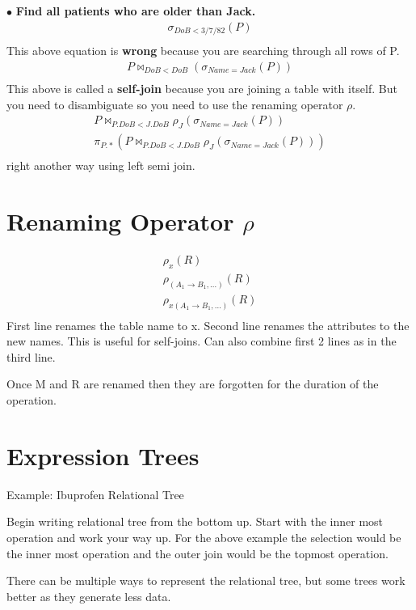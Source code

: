 \documentclass[twoside]{article}
\begin{document}
$\bullet$ \textbf{Find all patients who are older than Jack.}
\begin{gather*}
    \sigma_{DoB < 3/7/82}(P) \\
\end{gather*}
This above equation is \textbf{wrong} because you are searching through all 
rows of P.
\begin{gather*}
    P \bowtie_{DoB < DoB}(\sigma_{Name = Jack}(P)) \\
\end{gather*}
This above is called a \textbf{self-join} because you are joining a table with 
itself.
But you need to disambiguate so you need to use the renaming operator $\rho$.
\begin{gather*}
    P \bowtie_{P.DoB < J.DoB}\rho_J(\sigma_{Name = Jack}(P)) \\
    \pi_{P.*}(P \bowtie_{P.DoB < J.DoB}\rho_J(\sigma_{Name = Jack}(P))) \\
\end{gather*}
right another way using left semi join.

\section*{Renaming Operator $\rho$}
\begin{gather*}
    \rho_{x}(R) \\
    \rho_{(A_1\longrightarrow B_1, \dots)}(R) \\
    \rho_{x(A_1\longrightarrow B_1, \dots)}(R) \\
\end{gather*}
First line renames the table name to x. Second line renames the attributes to
the new names. This is useful for self-joins. Can also combine first 2 lines as
in the third line.

Once M and R are renamed then they are forgotten for the duration of the
operation.

\section*{Expression Trees}
Example: Ibuprofen Relational Tree

Begin writing relational tree from the bottom up. Start with the inner most
operation and work your way up. For the above example the selection would be the
inner most operation and the outer join would be the topmost operation.

There can be multiple ways to represent the relational tree, but some trees work
better as they generate less data.
\end{document}
